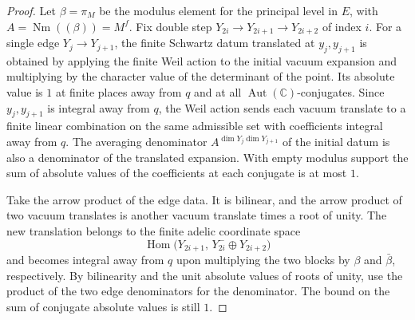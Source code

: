 \begin{proof}
Let $\beta=\pi_M$ be the modulus element for the principal level in $E$, with $A=\operatorname{Nm}((\beta))=M^f$. Fix double step $Y_{2i}\to Y_{2i+1}\to Y_{2i+2}$ of index $i$. For a single edge $Y_j\to Y_{j+1}$, the finite Schwartz datum translated at $y_j,y_{j+1}$ is obtained by applying the finite Weil action to the initial vacuum expansion and multiplying by the character value of the determinant of the point. Its absolute value is $1$ at finite places away from $q$ and at all $\operatorname{Aut}(\mathbb C)$-conjugates. Since $y_j,y_{j+1}$ is integral away from $q$, the Weil action sends each vacuum translate to a finite linear combination on the same admissible set with coefficients integral away from $q$. The averaging denominator $A^{\dim Y_j\dim Y_{j+1}}$ of the initial datum is also a denominator of the translated expansion. With empty modulus support the sum of absolute values of the coefficients at each conjugate is at most $1$.

Take the arrow product of the edge data. It is bilinear, and the arrow product of two vacuum translates is another vacuum translate times a root of unity. The new translation belongs to the finite adelic coordinate space
\[
 \operatorname{Hom}\bigl(Y_{2i+1},\,Y_{2i}^{-}\oplus Y_{2i+2}\bigr)
\]
and becomes integral away from $q$ upon multiplying the two blocks by $\beta$ and $\bar\beta$, respectively. By bilinearity and the unit absolute values of roots of unity, use the product of the two edge denominators for the denominator. The bound on the sum of conjugate absolute values is still $1$.


\end{proof}
